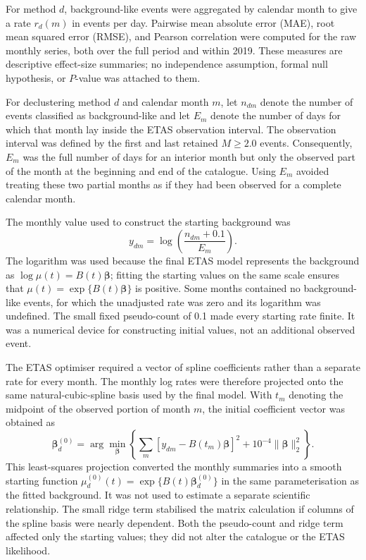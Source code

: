 For method $d$, background-like events were aggregated by calendar month to
give a rate $r_d(m)$ in events per day. Pairwise mean absolute error (MAE),
root mean squared error (RMSE), and Pearson correlation were computed for the
raw monthly series, both over the full period and within 2019. These measures
are descriptive effect-size summaries; no independence assumption, formal
null hypothesis, or $P$-value was attached to them.

For declustering method $d$ and calendar month $m$, let $n_{dm}$ denote the
number of events classified as background-like and let $E_m$ denote the
number of days for which that month lay inside the ETAS observation interval.
The observation interval was defined by the first and last retained
$M\geq2.0$ events. Consequently, $E_m$ was the full number of days for an
interior month but only the observed part of the month at the beginning and
end of the catalogue. Using $E_m$ avoided treating these two partial months
as if they had been observed for a complete calendar month.

The monthly value used to construct the starting background was
\[
y_{dm}=\log\left(\frac{n_{dm}+0.1}{E_m}\right).
\]
The logarithm was used because the final ETAS model represents the background
as $\log\mu(t)=B(t)\boldsymbol\beta$; fitting the starting values on the same
scale ensures that $\mu(t)=\exp\{B(t)\boldsymbol\beta\}$ is positive. Some
months contained no background-like events, for which the unadjusted rate was
zero and its logarithm was undefined. The small fixed pseudo-count of 0.1
made every starting rate finite. It was a numerical device for constructing
initial values, not an additional observed event.

The ETAS optimiser required a vector of spline coefficients rather than a
separate rate for every month. The monthly log rates were therefore projected
onto the same natural-cubic-spline basis used by the final model. With $t_m$
denoting the midpoint of the observed portion of month $m$, the initial
coefficient vector was obtained as
\[
\boldsymbol\beta_d^{(0)}=
\arg\min_{\boldsymbol\beta}
\left\{
\sum_m\left[y_{dm}-B(t_m)\boldsymbol\beta\right]^2
+10^{-4}\lVert\boldsymbol\beta\rVert_2^2
\right\}.
\]
This least-squares projection converted the monthly summaries into a smooth
starting function $\mu_d^{(0)}(t)=\exp\{B(t)\boldsymbol\beta_d^{(0)}\}$ in the
same parameterisation as the fitted background. It was not used to estimate a
separate scientific relationship. The small ridge term stabilised the matrix
calculation if columns of the spline basis were nearly dependent. Both the
pseudo-count and ridge term affected only the starting values; they did not
alter the catalogue or the ETAS likelihood.


